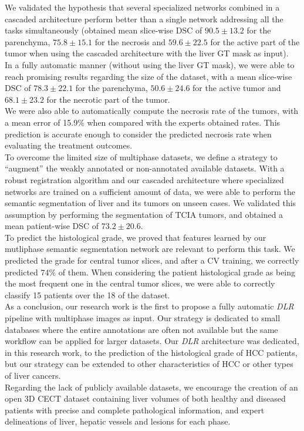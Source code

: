 We validated the hypothesis that several specialized networks combined
in a cascaded architecture perform better than a single network
addressing all the tasks simultaneously (obtained mean slice-wise DSC of
$ 90.5 \pm 13.2 $ for the parenchyma, $ 75.8 \pm 15.1 $ for the necrosis and $ 59.6 \pm
22.5 $ for the active part of the tumor when using the cascaded
architecture with the liver GT mask as input).\\
In a fully automatic manner (without using the liver GT mask), we were
able to reach promising results regarding the size of the dataset, with
a mean slice-wise DSC of $ 78.3 \pm 22.1 $ for the parenchyma, $ 50.6 \pm 24.6 $ for
the active tumor and $ 68.1 \pm 23.2 $ for the necrotic part of the tumor.\\
We were also able to automatically compute the necrosis rate of the
tumors, with a mean error of 15.9\% when compared with the experts
obtained rates. This prediction is accurate enough to consider the
predicted necrosis rate when evaluating the treatment outcomes. \\
To overcome the limited size of multiphase datasets, we define a
strategy to ``augment'' the weakly annotated or non-annotated available
datasets.
With a robust registration algorithm and our cascaded architecture where
specialized networks are trained on a sufficient amount of data, we were
able to perform the semantic segmentation of liver and its tumors on
unseen cases.
We validated this assumption by performing the segmentation of TCIA
tumors, and obtained a mean patient-wise DSC of $ 73.2 \pm 20.6 $.\\
To predict the histological grade, we proved that features learned by
our mutliphase semantic segmentation network are relevant to perform
this task.
We predicted the grade for central tumor slices, and after a CV
training, we correctly predicted 74\% of them. When considering the
patient histological grade as being the most frequent one in the central
tumor slices, we were able to correctly classify 15 patients over the 18
of the dataset.\\
As a conclusion, our research work is the first to propose a fully
automatic \emph{DLR} pipeline with multiphase images as input. Our
strategy is dedicated to small databases where the entire annotations
are often not available but the same workflow can be applied for larger
datasets. Our \emph{DLR} architecture was dedicated, in this research
work, to the prediction of the histological grade of HCC patients, but
our strategy can be extended to other characteristics of HCC or other
types of liver cancers.\\
Regarding the lack of publicly available datasets, we encourage the
creation of an open 3D CECT dataset containing liver volumes of both
healthy and diseased patients with precise and complete pathological
information, and expert delineations of liver, hepatic vessels and
lesions for each phase.
